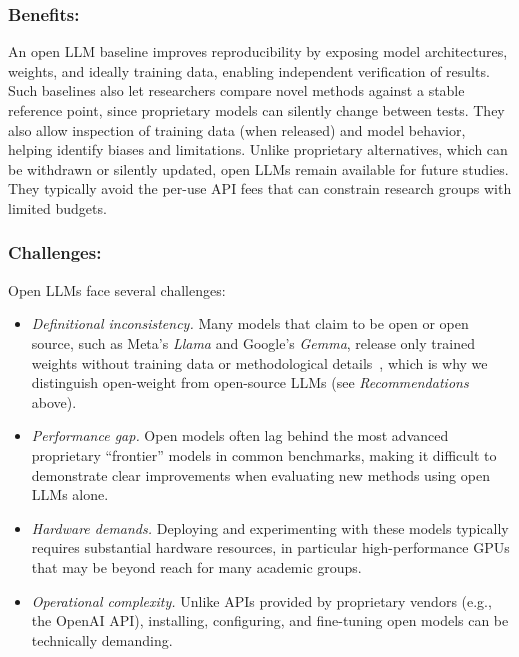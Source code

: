 \documentclass[smallextended]{svjour3}
\newcommand{\guidelinesubsubsection}[1]{\subsubsection{\bfseries #1:}}
\newcommand{\guidelinesubsubsection}[1]{\subsubsection{#1}}
\begin{document}
\guidelinesubsubsection{Benefits}

An open LLM baseline improves reproducibility by exposing model architectures, weights, and ideally training data, enabling independent verification of results.
Such baselines also let researchers compare novel methods against a stable reference point, since proprietary models can silently change between tests.
They also allow inspection of training data (when released) and model behavior, helping identify biases and limitations.
Unlike proprietary alternatives, which can be withdrawn or silently updated, open LLMs remain available for future studies.
They typically avoid the per-use API fees that can constrain research groups with limited budgets.

\guidelinesubsubsection{Challenges}

Open LLMs face several challenges:
\begin{itemize}
    \item \emph{Definitional inconsistency.} Many models that claim to be open or open source, such as Meta's \emph{Llama} and Google's \emph{Gemma}, release only trained weights without training data or methodological details~\cite{Gibney2024}, which is why we distinguish open-weight from open-source LLMs (see \emph{Recommendations} above).
    \item \emph{Performance gap.} Open models often lag behind the most advanced proprietary ``frontier'' models in common benchmarks, making it difficult to demonstrate clear improvements when evaluating new methods using open LLMs alone.
    \item \emph{Hardware demands.} Deploying and experimenting with these models typically requires substantial hardware resources, in particular high-performance GPUs that may be beyond reach for many academic groups.
    \item \emph{Operational complexity.} Unlike APIs provided by proprietary vendors (e.g., the OpenAI API), installing, configuring, and fine-tuning open models can be technically demanding.
\end{itemize}
\end{document}
